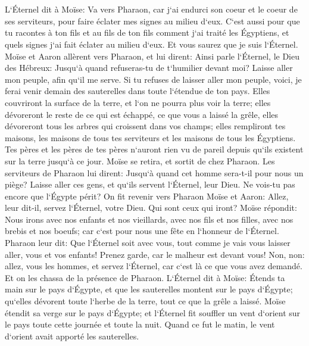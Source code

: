 \chapter{}

\verse L`Éternel dit à Moïse: Va vers Pharaon, car j`ai endurci son coeur et le coeur de ses serviteurs, pour faire éclater mes signes au milieu d`eux. 
\verse C`est aussi pour que tu racontes à ton fils et au fils de ton fils comment j`ai traité les Égyptiens, et quels signes j`ai fait éclater au milieu d`eux. Et vous saurez que je suis l`Éternel. 
\verse Moïse et Aaron allèrent vers Pharaon, et lui dirent: Ainsi parle l`Éternel, le Dieu des Hébreux: Jusqu`à quand refuseras-tu de t`humilier devant moi? Laisse aller mon peuple, afin qu`il me serve. 
\verse Si tu refuses de laisser aller mon peuple, voici, je ferai venir demain des sauterelles dans toute l`étendue de ton pays. 
\verse Elles couvriront la surface de la terre, et l`on ne pourra plus voir la terre; elles dévoreront le reste de ce qui est échappé, ce que vous a laissé la grêle, elles dévoreront tous les arbres qui croissent dans vos champs; 
\verse elles rempliront tes maisons, les maisons de tous tes serviteurs et les maisons de tous les Égyptiens. Tes pères et les pères de tes pères n`auront rien vu de pareil depuis qu`ils existent sur la terre jusqu`à ce jour. Moïse se retira, et sortit de chez Pharaon. 
\verse Les serviteurs de Pharaon lui dirent: Jusqu`à quand cet homme sera-t-il pour nous un piège? Laisse aller ces gens, et qu`ils servent l`Éternel, leur Dieu. Ne vois-tu pas encore que l`Égypte périt? 
\verse On fit revenir vers Pharaon Moïse et Aaron: Allez, leur dit-il, servez l`Éternel, votre Dieu. Qui sont ceux qui iront? 
\verse Moïse répondit: Nous irons avec nos enfants et nos vieillards, avec nos fils et nos filles, avec nos brebis et nos boeufs; car c`est pour nous une fête en l`honneur de l`Éternel. 
\verse Pharaon leur dit: Que l`Éternel soit avec vous, tout comme je vais vous laisser aller, vous et vos enfants! Prenez garde, car le malheur est devant vous! 
\verse Non, non: allez, vous les hommes, et servez l`Éternel, car c`est là ce que vous avez demandé. Et on les chassa de la présence de Pharaon. 
\verse L`Éternel dit à Moïse: Étends ta main sur le pays d`Égypte, et que les sauterelles montent sur le pays d`Égypte; qu`elles dévorent toute l`herbe de la terre, tout ce que la grêle a laissé. 
\verse Moïse étendit sa verge sur le pays d`Égypte; et l`Éternel fit souffler un vent d`orient sur le pays toute cette journée et toute la nuit. Quand ce fut le matin, le vent d`orient avait apporté les sauterelles. 
